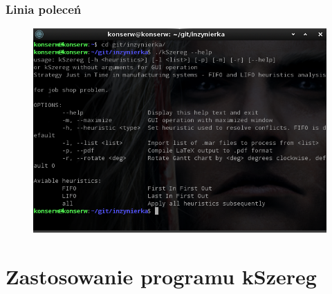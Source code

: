 \documentclass{prezentacja}
\begin{document}
\begin{frame}
    \frametitle{Linia poleceń}
    \begin{figure}[htb]
        \centering
        \includegraphics[height=.8\textheight, keepaspectratio=true]{./obrazki/s3}
    \end{figure}  
\end{frame}

\section{Zastosowanie programu kSzereg}
\end{document}
